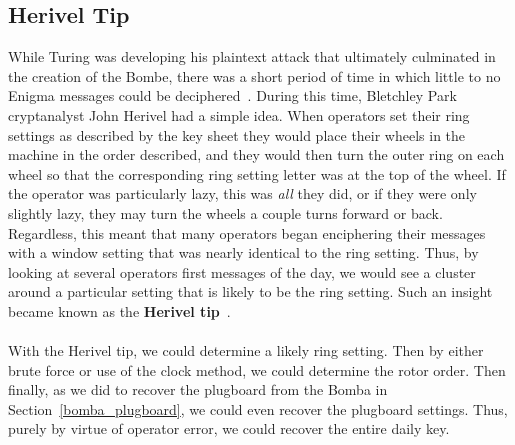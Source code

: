 \subsection{Herivel Tip}
While Turing was developing his plaintext attack that ultimately
culminated in the creation of the Bombe, there was a short period of time in which little to no Enigma
messages could be deciphered~\cite[p.~102]{Welchman1982HutSix}. During this time, Bletchley Park
cryptanalyst John Herivel had a simple idea. When operators set their
ring settings as described by the key sheet they would place their
wheels in the machine in the order described, and they would then
turn the outer ring on each wheel so that the corresponding ring
setting letter was at the top of the wheel. If the operator was
particularly lazy, this was \emph{all} they did, or if they were only
slightly lazy, they may turn the wheels a couple turns forward or
back. Regardless, this meant that many operators began enciphering
their messages with a window setting that was nearly identical to the
ring setting. Thus, by looking at several operators first messages of
the day, we would see a cluster around a particular setting
that is likely to be the ring setting. Such an insight became known
as the {\bf{Herivel tip}}~\cite[p.~143]{BudianskyBattleOfWits2000}.
\\\\With the Herivel tip, we could determine a likely ring setting.
Then by either brute force or use of the clock method, we could
determine the rotor order. Then finally, as we did to recover the
plugboard from the Bomba in Section~\ref{bomba_plugboard}, we could
even recover the plugboard settings. Thus, purely by virtue of
operator error, we could recover the entire daily key.

